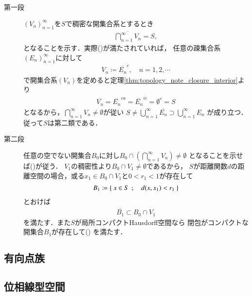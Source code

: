 	\begin{prf}\mbox{}
		\begin{description}
			\item[第一段]
				$(V_n)_{n=1}^\infty$を$S$で稠密な開集合系とするとき
				\begin{align}
					\overline{\bigcap_{n=1}^\infty V_n} = S,
					\label{eq:thm_Baire_category_theorem_1}
				\end{align}
				となることを示す．実際()が満たされていれば，
				任意の疎集合系$(E_n)_{n=1}^\infty$に対して
				\begin{align}
					V_n \coloneqq \overline{E_n}^c,
					\quad n=1,2,\cdots
				\end{align}
				で開集合系$(V_n)$を定めると定理\ref{thm:topology_note_closure_interior}より
				\begin{align}
					\overline{V_n} = \overline{E_n}^{ca} = \overline{E_n}^{ic} = \emptyset^c = S
				\end{align}
				となるから，$\bigcap_{n=1}^\infty V_n \neq \emptyset$が従い
				$S \neq \bigcup_{n=1}^\infty \overline{E_n} \supset \bigcup_{n=1}^\infty E_n$
				が成り立つ．従って$S$は第二類である．
				
			\item[第二段]
				任意の空でない開集合$B_0$に対し$B_0 \cap \left( \bigcap_{n=1}^\infty V_n \right) \neq \emptyset$
				となることを示せば()が従う．
				$V_1$の稠密性より$B_0 \cap V_1 \neq \emptyset$であるから，
				$S$が距離関数$d$の距離空間の場合，或る$x_1 \in B_0 \cap V_1$と$0 < r_1 < 1$が存在して
				\begin{align}
					B_1 \coloneqq \left\{\ x \in S\ \, ; \quad d(x,x_1) < r_1\ \right\}
				\end{align}
				とおけば
				\begin{align}
					\overline{B_1} \subset B_0 \cap V_1
					\label{eq:thm_Baire_category_theorem_2}
				\end{align}
				を満たす．また$S$が局所コンパクトHausdorff空間なら
				閉包がコンパクトな開集合$B_1$が存在して()
				を満たす．
				
		\end{description}
	\end{prf}
	
\subsection{有向点族}
\subsection{位相線型空間}
	